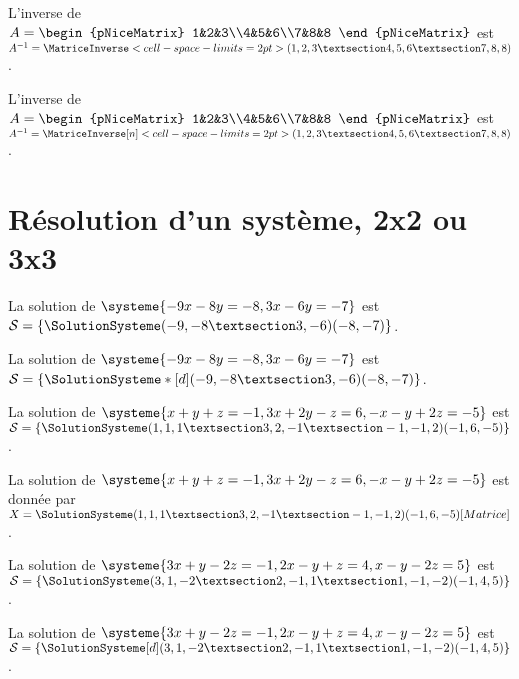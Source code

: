 \documentclass[french,a4paper,10pt]{article}
\begin{document}
\begin{ShowCodeTeX}
L'inverse de $A=\begin{pNiceMatrix} 1&2&3\\4&5&6\\7&8&8 \end{pNiceMatrix}$ est
$A^{-1}=\MatriceInverse<cell-space-limits=2pt>(1,2,3 § 4,5,6 § 7,8,8)$.
\end{ShowCodeTeX}

\begin{ShowCodeTeX}
L'inverse de $A=\begin{pNiceMatrix} 1&2&3\\4&5&6\\7&8&8 \end{pNiceMatrix}$ est
$A^{-1}=\MatriceInverse[n]<cell-space-limits=2pt>(1,2,3 § 4,5,6 § 7,8,8)$.
\end{ShowCodeTeX}

\section*{Résolution d'un système, 2x2 ou 3x3}

\begin{ShowCodeTeX}
La solution de $\systeme{-9x-8y=-8,3x-6y=-7}$ est $\mathcal{S}=%
\left\lbrace \SolutionSysteme(-9,-8 § 3,-6)(-8,-7) \right\rbrace$.
\end{ShowCodeTeX}

\begin{ShowCodeTeX}
La solution de $\systeme{-9x-8y=-8,3x-6y=-7}$ est $\mathcal{S}=%
\left\lbrace \SolutionSysteme*[d](-9,-8 § 3,-6)(-8,-7) \right\rbrace$.
\end{ShowCodeTeX}

\begin{ShowCodeTeX}
La solution de $\systeme{x+y+z=-1,3x+2y-z=6,-x-y+2z=-5}$ est $\mathcal{S}=%
\left\lbrace \SolutionSysteme(1,1,1 § 3,2,-1 § -1,-1,2)(-1,6,-5) \right\rbrace$.
\end{ShowCodeTeX}

\begin{ShowCodeTeX}
La solution de $\systeme{x+y+z=-1,3x+2y-z=6,-x-y+2z=-5}$ est donnée par $X=%
\SolutionSysteme(1,1,1 § 3,2,-1 § -1,-1,2)(-1,6,-5)[Matrice]$.
\end{ShowCodeTeX}

\begin{ShowCodeTeX}
La solution de $\systeme{3x+y-2z=-1,2x-y+z=4,x-y-2z=5}$ est $\mathcal{S}=%
\left\lbrace \SolutionSysteme(3,1,-2 § 2,-1,1 § 1,-1,-2)(-1,4,5) \right\rbrace$.
\end{ShowCodeTeX}

\begin{ShowCodeTeX}
La solution de $\systeme{3x+y-2z=-1,2x-y+z=4,x-y-2z=5}$ est $\mathcal{S}=%
\left\lbrace \SolutionSysteme[d](3,1,-2 § 2,-1,1 § 1,-1,-2)(-1,4,5) \right\rbrace$.
\end{ShowCodeTeX}
\end{document}
